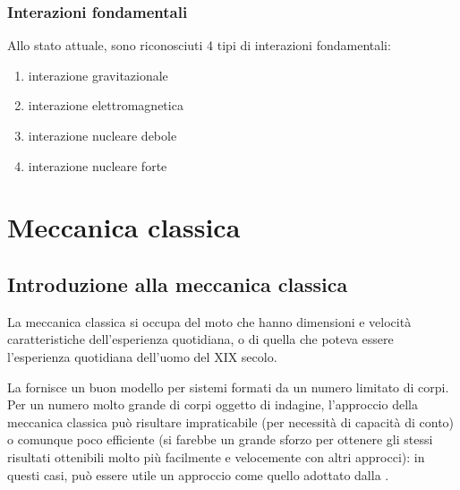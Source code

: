 \documentclass[letterpaper,10pt,italian]{jupyterBook}
\begin{document}
\section{Interazioni fondamentali}
\label{\detokenize{ch/intro/current-status:interazioni-fondamentali}}\label{\detokenize{ch/intro/current-status:physics-hs-intro-current-status-fundamental-interactions}}
\sphinxAtStartPar
Allo stato attuale, sono riconosciuti 4 tipi di interazioni fondamentali:
\begin{enumerate}
%
\item {} 
\sphinxAtStartPar
interazione gravitazionale

\item {} 
\sphinxAtStartPar
interazione elettromagnetica

\item {} 
\sphinxAtStartPar
interazione nucleare debole

\item {} 
\sphinxAtStartPar
interazione nucleare forte

\end{enumerate}

\sphinxstepscope


\part{Meccanica classica}

\sphinxstepscope




\chapter{Introduzione alla meccanica classica}
\label{\detokenize{ch/mechanics/intro:introduzione-alla-meccanica-classica}}\label{\detokenize{ch/mechanics/intro:physics-hs-mechanics-intro}}\label{\detokenize{ch/mechanics/intro::doc}}
\sphinxAtStartPar
La meccanica classica si occupa del moto che hanno dimensioni e velocità caratteristiche dell’esperienza quotidiana, o di quella che poteva essere l’esperienza quotidiana dell’uomo del XIX secolo.

\sphinxAtStartPar
La  fornisce un buon modello  per sistemi formati da un numero limitato di corpi. Per un numero molto grande di corpi oggetto di indagine, l’approccio della meccanica classica può risultare impraticabile (per necessità di capacità di conto) o comunque poco efficiente (si farebbe un grande sforzo per ottenere gli stessi risultati ottenibili molto più facilmente e velocemente con altri approcci): in questi casi, può essere utile un approccio  come quello adottato dalla {\hyperref[\detokenize{ch/thermodynamics/foundation:physics-hs-thermodynamics-intro}]{}}.
\end{document}
